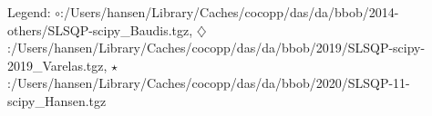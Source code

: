 Legend: {\color{CornflowerBlue}$\circ$}:/Users/hansen/Library/Caches/cocopp/das/da/bbob/2014-others/SLSQP-scipy\_Baudis.tgz, {{}$\diamondsuit$}:/Users/hansen/Library/Caches/cocopp/das/da/bbob/2019/SLSQP-scipy-2019\_Varelas.tgz, {\color{Green}$\star$}:/Users/hansen/Library/Caches/cocopp/das/da/bbob/2020/SLSQP-11-scipy\_Hansen.tgz